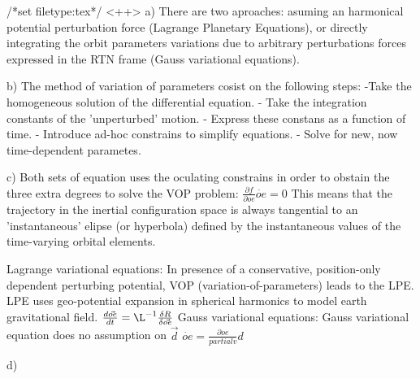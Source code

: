 /*set filetype:tex*/
<++>
a) There are two aproaches: asuming an harmonical potential perturbation force (Lagrange Planetary Equations), or directly integrating the orbit parameters variations due to arbitrary perturbations forces expressed in the RTN frame (Gauss variational equations).

b) The method of variation of parameters cosist on the following steps:
	-Take the homogeneous solution of the differential equation.
	- Take the integration constants of the 'unperturbed' motion.
	- Express these constans as a function of time.
	- Introduce ad-hoc constrains to simplify equations.
	- Solve for new, now time-dependent parametes.

c) Both sets of equation uses the oculating constrains in order to obstain the three extra degrees to solve the VOP problem:
$\frac{\partial f}{\partial oe} \dot{oe} = 0$
This means that the trajectory in the inertial configuration space is always tangential to an 'instantaneous' elipse (or hyperbola) defined by the instantaneous values of the time-varying orbital elements.

 Lagrange variational equations:
	In presence of a conservative, position-only dependent perturbing potential, VOP (variation-of-parameters) leads to the LPE. LPE uses geo-potential expansion in spherical harmonics to model earth gravitational field.
	$\frac{d\vec{oe}}{dt} = \L^{-1}\frac{\delta R}{\delta \vec{oe}} $
  Gauss variational equations:
	Gauss variational equation does no assumption on $\vec{d}$
	$\dot{oe}=\frac{\partial oe}{partial v} d$

d) 


